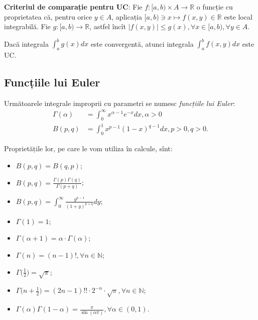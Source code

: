 \documentclass[11pt,a4paper]{article}
\newcommand\ds{\displaystyle}
\newcommand\NN{\mathbb{N}}
\newcommand\RR{\mathbb{R}}
\theoremstyle{dotless}
\theoremstyle{dotlessdr}
\begin{document}
\vspace{1cm}

\textbf{Criteriul de comparație pentru UC}: Fie $f: [a, b) \times A \to \RR$ o
funcție cu proprietatea că, pentru orice $y \in A$, aplicația
$[a, b) \ni x \mapsto f(x, y) \in \RR$ este local integrabilă. Fie $g : [a, b) \to \RR$,
astfel încît $|f(x, y)| \leq g(x), \forall x \in [a, b), \forall y \in A$.

Dacă integrala $\ds\int_a^b g(x) dx$ este convergentă, atunci integrala
$\ds\int_a^b f(x, y) dx$ este UC.


\subsection{Funcțiile lui Euler}
\label{subsec:f-euler}

Următoarele integrale improprii cu parametri se numesc \emph{funcțiile lui Euler}:
\begin{align*}
  \Gamma(\alpha) &= \int_0^\infty x^{\alpha - 1} e^{-x} dx, \alpha > 0 \\
  B(p, q) &= \int_0^1 x^{p-1} (1 - x)^{q - 1} dx, p > 0, q > 0.
\end{align*}

Proprietățile lor, pe care le vom utiliza în calcule, sînt:
\begin{itemize}
\item $B(p, q) = B(q, p)$;
\item $B(p, q) = \frac{\Gamma(p)\Gamma(q)}{\Gamma(p + q)}$;
\item $B(p, q) = \ds\int_0^\infty \frac{y^{p-1}}{(1 + y)^{p + q}} dy$;
\item $\Gamma(1) = 1$;
\item $\Gamma(\alpha + 1) = \alpha \cdot \Gamma(\alpha)$;
\item $\Gamma(n) = (n - 1)!, \forall n \in \NN$;
\item $\Gamma\big( \frac{1}{2} \big) = \sqrt{\pi}$;
\item $\Gamma\big( n + \frac{1}{2} \big) = (2n - 1)!! \cdot 2^{-n} \cdot \sqrt{\pi}, %
  \forall n \in \NN$;
\item $\Gamma(\alpha) \Gamma(1 - \alpha) = \frac{\pi}{\sin(\alpha \pi)}, %
  \forall \alpha \in (0, 1)$.
\end{itemize}

\end{document}
